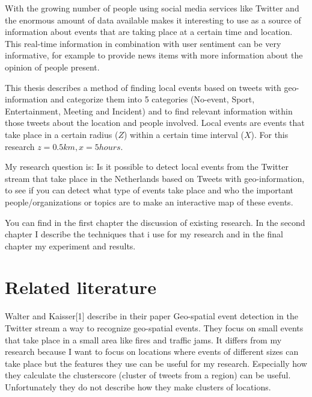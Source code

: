 \documentclass[
10pt, %
a4paper, %
oneside, %
headinclude,footinclude, %
BCOR5mm, %
]{scrartcl}
\begin{document}
With the growing number of people using social media services like Twitter and the enormous amount of data available makes it interesting to use as a source of information about events that are taking place at a certain time and location. This real-time information in combination with user sentiment can be very informative, for example to provide news items with more information about the opinion of people present.

This thesis describes a method of finding local events based on tweets with geo-information and categorize them into 5 categories (No-event, Sport, Entertainment, Meeting and Incident) and to find relevant information within those tweets about the location and people involved. Local events are events that take place in a certain radius (\begin{math}Z\end{math}) within a certain time interval (\begin{math}X\end{math}). For this research \begin{math}z= 0.5km , x= 5 hours\end{math}.

My research question is: Is it possible to detect local events from the Twitter stream that take place in the Netherlands based on Tweets with geo-information, to see if you can detect what type of events take place and who the important people/organizations or topics are to make an interactive map of these events.

You can find in the first chapter the discussion of existing research. In the second chapter I describe the techniques that i use for my research and in the final chapter my experiment and results.

\newpage
\section{Related literature}
Walter and Kaisser[1] describe in their paper Geo-spatial event detection in the Twitter stream a way to recognize geo-spatial events. They focus on small events that take place in a small area like fires and traffic jams. It differs from my research because I want to focus on locations where events of different sizes can take place but the features they use can be useful for my research. Especially how they calculate the clusterscore (cluster of tweets from a region) can be useful. Unfortunately they do not describe how they make clusters of locations.
\end{document}

